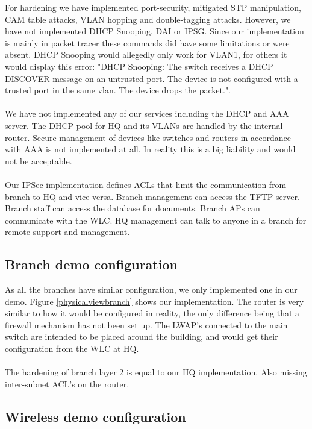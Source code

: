
For hardening we have implemented port-security, mitigated STP manipulation, CAM table attacks, VLAN hopping and double-tagging attacks. However, we have not implemented DHCP Snooping, DAI or IPSG. Since our implementation is mainly in packet tracer these commands did have some limitations or were absent. DHCP Snooping would allegedly only work for VLAN1, for others it would display this error: "DHCP Snooping: The switch receives a DHCP DISCOVER message on an untrusted port. The device is not configured with a trusted port in the same vlan.  The device drops the packet.".
\\
\\
We have not implemented any of our services including the DHCP and AAA server. The DHCP pool for HQ and its VLANs are handled by the internal router. Secure management of devices like switches and routers in accordance with AAA is not implemented at all. In reality this is a big liability and would not be acceptable.
\\
\\
Our IPSec implementation defines ACLs that limit the communication from branch to HQ and vice versa. Branch management can access the TFTP server. Branch staff can access the database for documents. Branch APs can communicate with the WLC. HQ management can talk to anyone in a branch for remote support and management.

\subsection{Branch demo configuration}


As all the branches have similar configuration, we only implemented one in our demo. Figure \ref{physicalviewbranch} shows our implementation. %
The router is very similar to how it would be configured in reality, the only difference being that a firewall mechanism has not been set up. The LWAP's connected to the main switch are intended to be placed around the building, and would get their configuration from the WLC at HQ.
\\
\\
The hardening of branch layer 2 is equal to our HQ implementation. Also missing inter-subnet ACL's on the router.

\subsection{Wireless demo configuration} \label{demowireless}

